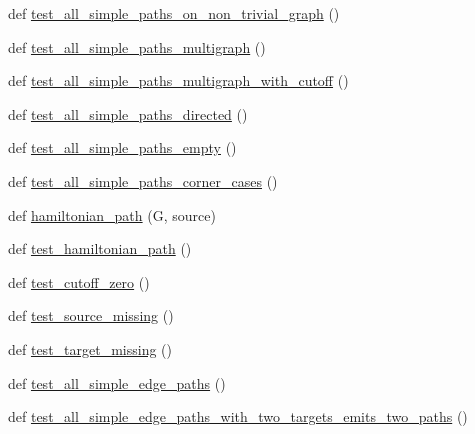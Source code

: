 \begin{DoxyCompactItemize}
\item 
def \hyperlink{namespacenetworkx_1_1algorithms_1_1tests_1_1test__simple__paths_a5685881fa98bb90900273a4657cf6734}{test\+\_\+all\+\_\+simple\+\_\+paths\+\_\+on\+\_\+non\+\_\+trivial\+\_\+graph} ()
\item 
def \hyperlink{namespacenetworkx_1_1algorithms_1_1tests_1_1test__simple__paths_a8cf2b9b9e44a0c713eac20b2fdeebfcd}{test\+\_\+all\+\_\+simple\+\_\+paths\+\_\+multigraph} ()
\item 
def \hyperlink{namespacenetworkx_1_1algorithms_1_1tests_1_1test__simple__paths_a5e75520c5594f6438edd29b356697152}{test\+\_\+all\+\_\+simple\+\_\+paths\+\_\+multigraph\+\_\+with\+\_\+cutoff} ()
\item 
def \hyperlink{namespacenetworkx_1_1algorithms_1_1tests_1_1test__simple__paths_a8822eedf1530a337804ea3bf524a4252}{test\+\_\+all\+\_\+simple\+\_\+paths\+\_\+directed} ()
\item 
def \hyperlink{namespacenetworkx_1_1algorithms_1_1tests_1_1test__simple__paths_aa87bdb97911c082549e2d10ff0fa08ff}{test\+\_\+all\+\_\+simple\+\_\+paths\+\_\+empty} ()
\item 
def \hyperlink{namespacenetworkx_1_1algorithms_1_1tests_1_1test__simple__paths_a4ac1f48cf52954450055a4b666cb61bd}{test\+\_\+all\+\_\+simple\+\_\+paths\+\_\+corner\+\_\+cases} ()
\item 
def \hyperlink{namespacenetworkx_1_1algorithms_1_1tests_1_1test__simple__paths_aee1c8af7f3c45707dca0a6b9c492f9b8}{hamiltonian\+\_\+path} (G, source)
\item 
def \hyperlink{namespacenetworkx_1_1algorithms_1_1tests_1_1test__simple__paths_a315f8a2a7d7801440ccb7bc8b26e8693}{test\+\_\+hamiltonian\+\_\+path} ()
\item 
def \hyperlink{namespacenetworkx_1_1algorithms_1_1tests_1_1test__simple__paths_a8437710f670553bb3de49b548fac9699}{test\+\_\+cutoff\+\_\+zero} ()
\item 
def \hyperlink{namespacenetworkx_1_1algorithms_1_1tests_1_1test__simple__paths_add8da04c0fec56d7a2f1d52caaf5e7b4}{test\+\_\+source\+\_\+missing} ()
\item 
def \hyperlink{namespacenetworkx_1_1algorithms_1_1tests_1_1test__simple__paths_aba15ef6ab21e27b9f5ab2fca324e8bcc}{test\+\_\+target\+\_\+missing} ()
\item 
def \hyperlink{namespacenetworkx_1_1algorithms_1_1tests_1_1test__simple__paths_ab2bdc3f2136b2b4c58821a0ed44d44b8}{test\+\_\+all\+\_\+simple\+\_\+edge\+\_\+paths} ()
\item 
def \hyperlink{namespacenetworkx_1_1algorithms_1_1tests_1_1test__simple__paths_ab619abcfde6f2783db9555695d35181e}{test\+\_\+all\+\_\+simple\+\_\+edge\+\_\+paths\+\_\+with\+\_\+two\+\_\+targets\+\_\+emits\+\_\+two\+\_\+paths} ()

\end{DoxyCompactItemize}
